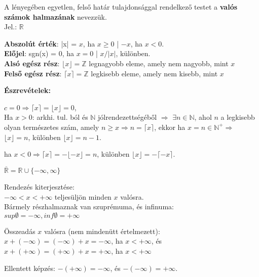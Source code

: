 \begin{frame}
\begin{tcolorbox}[title={Def.: Valós számok halmaza}]
  A lényegében egyetlen, felső határ tulajdonsággal rendelkező testet a \textbf{valós számok halmazának} nevezzük.\\
  Jel.: $\mathbb{R}$
\end{tcolorbox}

\begin{tcolorbox}[title={Def.: néhány Függvény (?)}]
  \textbf{Abszolút érték}: |x| = $x$, ha $x \geq 0$ | $-x$, ha $x < 0$.\\
  \textbf{Előjel}: sgn(x) = $0$, ha $x = 0$ | $x / |x|$, különben.\\
  \textbf{Alsó egész rész}: ${\lfloor}x{\rfloor} = \mathbb{Z}$ legnagyobb eleme, amely nem nagyobb, mint $x$\\
  \textbf{Felső egész rész}: ${\lceil}x{\rceil} = \mathbb{Z}$ legkisebb eleme, amely nem kisebb, mint $x$\\
  \mbigskip
  
  \textbf{Észrevételek:}\\
  \mmedskip
  
  $c = 0 \Rightarrow {\lceil}x{\rceil} = {\lfloor}x{\rfloor} = 0$,\\
  Ha $x > 0$: arkhi. tul. ból és $\mathbb{N}$ jólrendezettségéből $\Rightarrow$ ${\exists}n \in \mathbb{N}$, ahol $n$ a legkisebb olyan természetes szám, amely $n \geq x \Rightarrow n = {\lceil}x{\rceil}$, ekkor ha $x = n \in \mathbb{N}^+ \Rightarrow$ ${\lfloor}x{\rfloor} = n$, különben ${\lfloor}x{\rfloor} = n - 1$.\\
  \mmedskip
  
  ha $x < 0 \Rightarrow {\lceil}x{\rceil} = -{\lfloor}-x{\rfloor} = n$, különben ${\lfloor}x{\rfloor} = -{\lceil}-x{\rceil}$.
\end{tcolorbox}
\end{frame}


\begin{frame}
\begin{tcolorbox}[title={Def.: Bővített valós számok}]
  $\overline{\mathbb{R}} = \mathbb{R} \cup \{ -{\infty}, {\infty}\}$\\
  \mbigskip
  
  Rendezés kiterjesztése:\\
  $-{\infty} < x < +{\infty}$ teljesüljön minden $x$ valósra.\\
  Bármely részhalmaznak van szuprémuma, és infinuma:\\
  $sup{\emptyset} = -{\infty}, inf{\emptyset} = +{\infty}$\\
  \mmedskip
  
  Összeadás $x$ valósra (nem mindenütt értelmezett):\\
  $x + (-{\infty}) = (-{\infty}) + x = -{\infty}$, ha $x < +{\infty}$, és $x + (+{\infty}) = (+{\infty}) + x = +{\infty}$, ha $x < +{\infty}$\\
  \mmedskip
  
  Ellentett képzés: $-(+{\infty}) = -{\infty}$, és $-(-{\infty}) = +{\infty}$.
\end{tcolorbox}
\end{frame}


